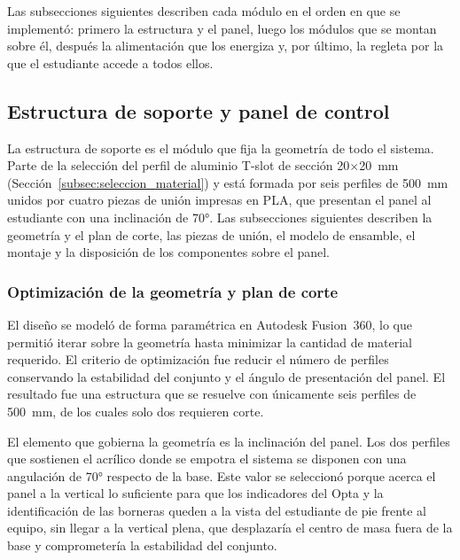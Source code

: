 \documentclass[12pt,a4paper,oneside]{report}
\begin{document}
Las subsecciones siguientes describen cada módulo en el orden en que se implementó: primero la estructura y el panel, luego los módulos que se montan sobre él, después la alimentación que los energiza y, por último, la regleta por la que el estudiante accede a todos ellos.

\subsection{Estructura de soporte y panel de control}
\label{subsec:hw_estructura}

La estructura de soporte es el módulo que fija la geometría de todo el sistema. Parte de la selección del perfil de aluminio T-slot de sección 20$\times$20~mm (Sección~\ref{subsec:seleccion_material}) y está formada por seis perfiles de 500~mm unidos por cuatro piezas de unión impresas en PLA, que presentan el panel al estudiante con una inclinación de 70°. Las subsecciones siguientes describen la geometría y el plan de corte, las piezas de unión, el modelo de ensamble, el montaje y la disposición de los componentes sobre el panel.

\subsubsection{Optimización de la geometría y plan de corte}

El diseño se modeló de forma paramétrica en Autodesk Fusion~360, lo que permitió iterar sobre la geometría hasta minimizar la cantidad de material requerido. El criterio de optimización fue reducir el número de perfiles conservando la estabilidad del conjunto y el ángulo de presentación del panel. El resultado fue una estructura que se resuelve con únicamente seis perfiles de 500~mm, de los cuales solo dos requieren corte.

El elemento que gobierna la geometría es la inclinación del panel. Los dos perfiles que sostienen el acrílico donde se empotra el sistema se disponen con una angulación de 70° respecto de la base. Este valor se seleccionó porque acerca el panel a la vertical lo suficiente para que los indicadores del Opta y la identificación de las borneras queden a la vista del estudiante de pie frente al equipo, sin llegar a la vertical plena, que desplazaría el centro de masa fuera de la base y comprometería la estabilidad del conjunto.
\end{document}
